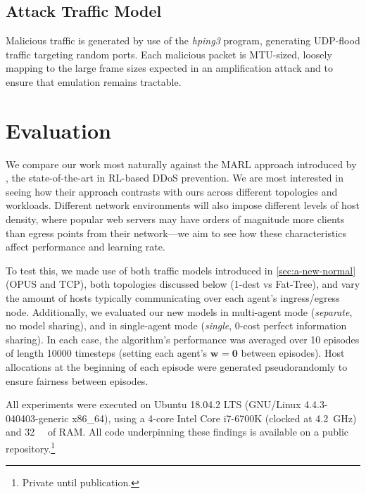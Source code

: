 \documentclass[10pt, times, comsoc]{IEEEtran}
\newcommand{\wvec}[1]{\ensuremath{\bm{w}_{#1}}}
\begin{document}
\subsection{Attack Traffic Model}
Malicious traffic is generated by use of the \emph{hping3} program, generating UDP-flood traffic targeting random ports.
Each malicious packet is MTU-sized, loosely mapping to the large frame sizes expected in an amplification attack and to ensure that emulation remains tractable.

\section{Evaluation}


We compare our work most naturally against the MARL approach introduced by \textcite{DBLP:journals/eaai/MalialisK15}, the state-of-the-art in RL-based DDoS prevention.
We are most interested in seeing how their approach contrasts with ours across different topologies and workloads.
Different network environments will also impose different levels of host density, where popular web servers may have orders of magnitude more clients than egress points from their network---we aim to see how these characteristics affect performance and learning rate.

To test this, we made use of both traffic models introduced in \cref{sec:a-new-normal} (OPUS and TCP), both topologies discussed below (1-dest vs Fat-Tree), and vary the amount of hosts typically communicating over each agent's ingress/egress node.
Additionally, we evaluated our new models in multi-agent mode (\emph{separate}, no model sharing), and in single-agent mode (\emph{single}, 0-cost perfect information sharing).
In each case, the algorithm's performance was averaged over \num{10} episodes of length \num{10000} timesteps (setting each agent's $\wvec{}=\bm{0}$ between episodes).
Host allocations at the beginning of each episode were generated pseudorandomly to ensure fairness between episodes.

All experiments were executed on Ubuntu 18.04.2 LTS (GNU/Linux 4.4.3-040403-generic x86\_64), using a 4-core Intel Core i7-6700K (clocked at \SI{4.2}{\giga\hertz}) and \SI{32}{\gibi\byte} of RAM.
All code underpinning these findings is available on a public repository.\footnote{Private until publication.}
\end{document}
